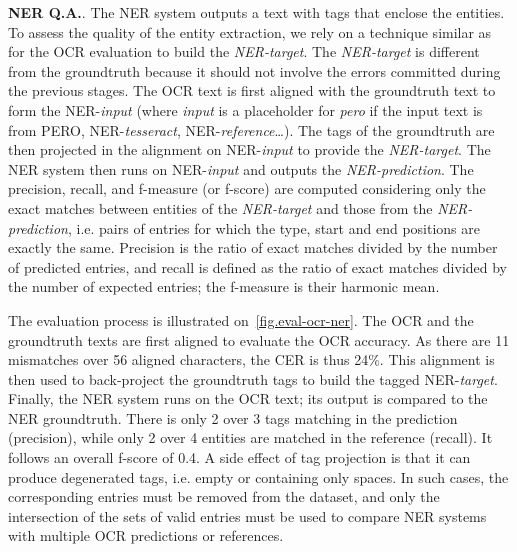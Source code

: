 

\textbf{NER Q.A.}. The NER system outputs a text with tags that enclose the entities. To assess the quality of the
entity extraction, we rely on a technique similar as for the OCR evaluation to build the \emph{NER-target}. The
\emph{NER-target} is different from the groundtruth because it should not involve the errors committed during the
previous stages. The OCR text is first aligned with the groundtruth text to form the NER-\emph{input} (where
\emph{input} is a placeholder for \emph{pero} if the input text is from PERO, NER-\emph{tesseract},
NER-\emph{reference}\ldots). The tags of the groundtruth are then projected in the alignment on NER-\emph{input} to
provide the \emph{NER-target}. The NER system then runs on NER-\emph{input} and outputs the \emph{NER-prediction}. The
precision, recall, and f-measure (or f-score) are computed considering only the exact matches between entities of the
\emph{NER-target} and those from the \emph{NER-prediction}, i.e. pairs of entries for which the type, start and end positions are exactly the same.
Precision is the ratio of exact matches divided by the number of predicted entries,
and recall is defined as the ratio of exact matches divided by the number of expected entries;
the f-measure is their harmonic mean.

The evaluation process is illustrated on~\cref{fig.eval-ocr-ner}. The OCR and the groundtruth texts are first aligned to
evaluate the OCR accuracy. As there are 11 mismatches over 56 aligned characters, the CER is thus 24\%. This alignment
is then used to back-project the groundtruth tags to build the tagged NER-\emph{target}. Finally, the NER system runs on the
OCR text; its output is compared to the NER groundtruth. There is only 2 over 3 tags matching in the prediction (precision),
while only 2 over 4 entities are matched in the reference (recall). It follows an overall f-score of 0.4.
%
A side effect of tag projection is that it can produce degenerated tags, i.e. empty or containing only spaces.
In such cases, the corresponding entries must be removed from the dataset,
and only the intersection of the sets of valid entries must be used to compare NER systems with multiple OCR predictions or references.




